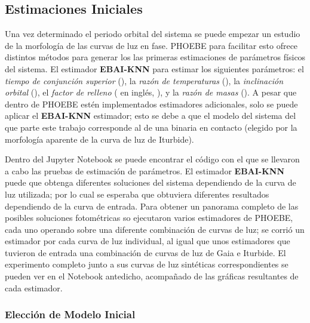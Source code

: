 \subsection{Estimaciones Iniciales}
\label{metodologia:modelocomputacional:estimacionesiniciales}

Una vez determinado el periodo orbital del sistema se puede empezar un estudio
de la morfología de las curvas de luz en fase. PHOEBE para facilitar esto ofrece
distintos métodos para generar los las primeras estimaciones de parámetros
físicos del sistema. El estimador \textbf{EBAI-KNN} para estimar los siguientes
parámetros: el \textit{tiempo de conjunción superior} (), la
\textit{razón de temperaturas} (), la \textit{inclinación
orbital} (), el \textit{factor de relleno}
( en inglés, ), y la
\textit{razón de masas} (). A pesar que dentro de PHOEBE estén
implementados estimadores adicionales, solo se puede aplicar el
\textbf{EBAI-KNN} estimador; esto se debe a que el modelo del sistema del que
parte este trabajo corresponde al de una binaria en contacto (elegido por la
morfología aparente de la curva de luz de Iturbide).

Dentro del Jupyter Notebook
\href{https://github.com/KnightIV/UANL_MAPTA_PlanObservaciones/blob/main/analisis/phoebe_model/estimations/ebai-default.ipynb}{}
se puede encontrar el código con el que se llevaron a cabo las pruebas de
estimación de parámetros. El estimador \textbf{EBAI-KNN} puede que obtenga
diferentes soluciones del sistema dependiendo de la curva de luz utilizada; por
lo cual se esperaba que obtuviera diferentes resultados dependiendo de la curva
de entrada. Para obtener un panorama completo de las posibles soluciones
fotométricas so ejecutaron varios estimadores de PHOEBE, cada uno operando sobre
una diferente combinación de curvas de luz; se corrió un estimador por cada
curva de luz individual, al igual que unos estimadores que tuvieron de entrada
una combinación de curvas de luz de Gaia e Iturbide. El experimento completo
junto a sus curvas de luz sintéticas correspondientes se pueden ver en el
Notebook antedicho, acompañado de las gráficas resultantes de cada estimador.

\subsubsection{Elección de Modelo Inicial}
\label{metodologia:modelocomputacional:estimacionesiniciales:eligiendomodeloinicial}

